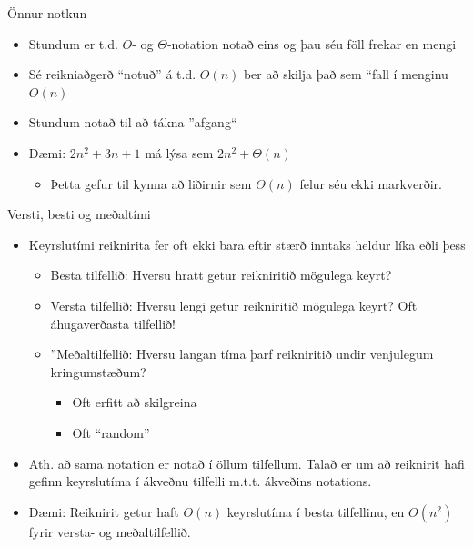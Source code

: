 \documentclass{beamer}
\begin{document}
\begin{frame}{Önnur notkun}
\begin{itemize}
 \item Stundum er t.d. $O$- og $\Theta$-notation notað eins og þau séu föll frekar en mengi
 \item Sé reikniaðgerð ``notuð'' á t.d. $O(n)$ ber að skilja það sem ``fall í menginu $O(n)$
 \item Stundum notað til að tákna ''afgang`` 
 \item Dæmi: $2n^2 + 3n + 1$ má lýsa sem $2n^2 + \Theta(n)$
 \begin{itemize}
  \item Þetta gefur til kynna að liðirnir sem $\Theta(n)$ felur séu ekki markverðir.
 \end{itemize}
\end{itemize}
\end{frame}

\begin{frame}{Versti, besti og meðaltími}
\begin{itemize}
 \item Keyrslutími reiknirita fer oft ekki bara eftir stærð inntaks heldur líka eðli þess
 \begin{itemize}
  \item Besta tilfellið: Hversu hratt getur reikniritið mögulega keyrt?
  \item Versta tilfellið: Hversu lengi getur reikniritið mögulega keyrt? Oft áhugaverðasta tilfellið!
  \item ''Meðaltilfellið: Hversu langan tíma þarf reikniritið undir venjulegum kringumstæðum?
  \begin{itemize}
   \item Oft erfitt að skilgreina
   \item Oft ``random''
  \end{itemize}
 \end{itemize}
 \item Ath. að sama notation er notað í öllum tilfellum. Talað er um að reiknirit hafi gefinn keyrslutíma í ákveðnu tilfelli m.t.t. ákveðins notations.
 \item Dæmi: Reiknirit getur haft $O(n)$ keyrslutíma í besta tilfellinu, en $O(n^2)$ fyrir versta- og meðaltilfellið.
\end{itemize}
\end{frame}
\end{document}
